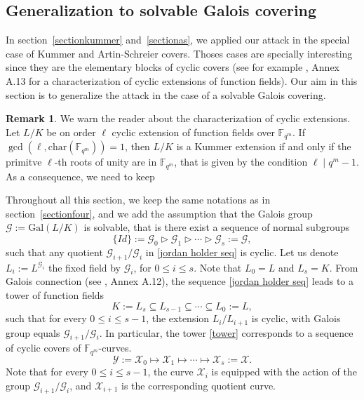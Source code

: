 \documentclass[10pt]{article}
\theoremstyle{definition}
\theoremstyle{definition}
\newtheorem{rq1}[thm]{Remark}
\theoremstyle{definition}
\newcommand{\s}{\vspace{0.3cm}}
\newcommand{\fqm}{\mathbb{F}_{q^m}}
\newcommand{\su}{\subseteq}
\newcommand{\X}{\mathcal{X}}
\newcommand{\Y}{\mathcal{Y}}
\newcommand{\G}{\mathcal{G}}
\begin{document}
\s


\subsection{Generalization to solvable Galois covering}

\s

In section~\ref{sectionkummer} and~\ref{sectionas}, we applied our attack in the special case of Kummer and Artin-Schreier covers. Thoses cases are specially interesting since they are the elementary blocks of cyclic covers (see for example \cite{Sti}, Annex A.13 for a characterization of cyclic extensions of function fields). Our aim in this section is to generalize the attack in the case of a solvable Galois covering.

\s

\color{purple}
\begin{rq1} \label{racinesdel'unite}
We warn the reader about the characterization of cyclic extensions. 
Let $L/K$ be on order $\ell$ cyclic extension of function fields over $\fqm$. If $\gcd(\ell,\mathrm{char}(\fqm))=1$, then $L/K$ is a Kummer extension if and only if the primitve $\ell$-th roots of unity are in $\fqm$, that is given by the condition $\ell \mid q^m-1$. As a consequence, we need to keep  
\end{rq1}

\s

Throughout all this section, we keep the same notations as in section~\ref{sectionfour}, and we add the assumption that the Galois group $\G := \mathrm{Gal}(L/K)$ is solvable,  \color{black} that is there exist a sequence of normal subgroups 
\begin{equation} \label{jordan holder seq}
 \{Id\} := \G_0 \triangleright \G_1 \triangleright \cdots \triangleright \G_s := \G, 
\end{equation} 
such that any quotient $\G_{i+1}/\G_i$ in \eqref{jordan holder seq} is cyclic. Let us denote $L_i := L^{\G_i}$ the fixed field by $\G_i$, for $0 \leq i \leq s$. Note that $L_0=L$ and $L_s=K$. From Galois connection (see \cite{Sti}, Annex A.12), the sequence \eqref{jordan holder seq} leads to a tower of function fields
\begin{equation} \label{tower}
K := L_s \su L_{s-1} \su \cdots \su L_0 := L,
\end{equation}
such that for every $0\leq i\leq s-1$, the extension $L_i/L_{i+1}$ is cyclic, with Galois group equals $\G_{i+1}/\G_i$. In particular, the tower \eqref{tower} corresponds to a sequence of cyclic covers of $\fqm$-curves.
\begin{equation} \label{curve tower}
\Y := \X_0 \longmapsto \X_1 \longmapsto \cdots \longmapsto \X_s := \X.
\end{equation}
Note that for every $0 \leq i \leq s-1$, the curve $\X_i$ is equipped with the action of the group $\G_{i+1}/\G_i$, and $\X_{i+1}$ is the corresponding quotient curve. 
\end{document}
